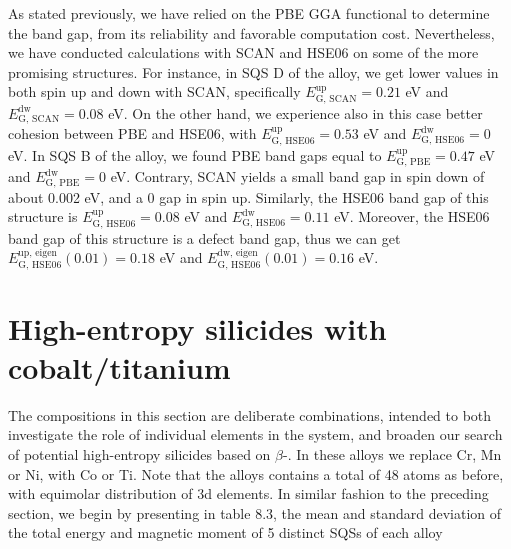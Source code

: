 As stated previously, we have relied on the PBE GGA functional to determine the band gap, from its reliability and favorable computation cost. Nevertheless, we have conducted calculations with SCAN and HSE06 on some of the more promising structures. For instance, in SQS D of the  alloy, we get lower values in both spin up and down with SCAN, specifically $E_\text{G, SCAN} ^\text{up}= 0.21$ eV and $E_\text{G, SCAN} ^\text{dw} = 0.08$ eV. On the other hand, we experience also in this case better cohesion between PBE and HSE06, with $E_\text{G, HSE06} ^\text{up} = 0.53$ eV and $E_\text{G, HSE06} ^\text{dw} = 0$ eV. In SQS B of the  alloy, we found PBE band gaps equal to $E_\text{G, PBE} ^\text{up} = 0.47$ eV and $E_\text{G, PBE} ^\text{dw} = 0$ eV. Contrary, SCAN yields a small band gap in spin down of about 0.002 eV, and a 0 gap in spin up. Similarly, the HSE06 band gap of this structure is $E_\text{G, HSE06} ^\text{up} = 0.08$ eV and $E_\text{G, HSE06} ^\text{dw} = 0.11$ eV. Moreover, the HSE06 band gap of this structure is a defect band gap, thus we can get $E_\text{G, HSE06} ^\text{up, eigen}(0.01) = 0.18$ eV and $E_\text{G, HSE06} ^\text{dw, eigen}(0.01) = 0.16$ eV. 

\newpage
\section{High-entropy silicides with cobalt/titanium}

The compositions in this section are deliberate combinations, intended to both investigate the role of individual elements in the  system, and broaden our search of potential high-entropy silicides based on $\beta$-. In these alloys we replace Cr, Mn or Ni, with Co or Ti. Note that the alloys contains a total of 48 atoms as before, with equimolar distribution of 3d elements. In similar fashion to the preceding section, we begin by presenting in table 8.3, the mean and standard deviation of the total energy and magnetic moment of 5 distinct SQSs of each alloy

